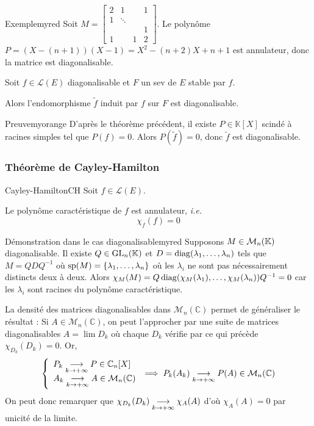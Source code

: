     \begin{omed}{Exemple}{myred}
        Soit $M = \begin{bmatrix}
            2 & 1 & & 1 \\
            1 & \ddots & & \\
            & & & 1 \\
            1 & & 1 & 2
        \end{bmatrix}$. Le polynôme $P = (X - (n+1))(X-1) = X^2 - (n+2) X + n+1$ est annulateur, donc la matrice est diagonalisable.
    \end{omed}

    \begin{coro}{}{}
        Soit $f \in \mathcal{L}(E)$ diagonalisable et $F$ un sev de $E$ stable par $f$.

        Alors l’endomorphisme $\tilde{f}$ induit par $f$ sur $F$ est diagonalisable.
    \end{coro}

    \begin{demo}{Preuve}{myorange}
        D’après le théorème précédent, il existe $P \in \mathbb{K}[X]$ scindé à racines simples tel que $P(f) = 0$. Alors $P(\tilde{f}) = 0$, donc $\tilde{f}$ est diagonalisable.
    \end{demo}

    \subsubsection{Théorème de Cayley-Hamilton}

    \begin{theo}{Cayley-Hamilton}{CH}
        Soit $f \in \mathcal{L}(E)$.

        Le polynôme caractéristique de $f$ est annulateur, \textit{i.e.} 
        \[ \chi_f(f) = 0 \]
    \end{theo}

    \begin{demo}{Démonstration dans le cas diagonalisable}{myred}
        Supposons $M \in \mk{n}$ diagonalisable. Il existe $Q \in \GL_n(\mathbb{K})$ et $D = \diag(\lambda_1,\ldots,\lambda_n)$ tels que $M = Q D Q^{-1}$ où $\sp(M) = \left\{\lambda_1,\ldots,\lambda_n\right\}$ où les $\lambda_i$ ne sont pas nécessairement distincts deux à deux. Alors $\chi_M(M) = Q \diag(\chi_M(\lambda_1), \ldots, \chi_M(\lambda_n)) Q^{-1} = 0$ car les $\lambda_i$ sont racines du polynôme caractéristique.

        La densité des matrices diagonalisables dans $\mathcal{M}_n(\mathbb{C})$ permet de généraliser le résultat : Si $A \in \mathcal{M}_n(\mathbb{C})$, on peut l’approcher par une suite de matrices diagonalisables $A = \lim D_k$ où chaque $D_k$ vérifie par ce qui précède $\chi_{D_k}(D_k) = 0$. Or, 
        \[ \et{P_k \limi{k}{+\infty} P \in \mathbb{C}_n[X]}{A_k \limi{k}{+\infty} A \in \mathcal{M}_n(\mathbb{C})} \implies P_k(A_k) \limi{k}{+\infty} P(A) \in \mathcal{M}_n(\mathbb{C}) \]    
        On peut donc remarquer que $\chi_{D_k}(D_k) \limi{k}{+\infty} \chi_A(A)$ d’où $\chi_A(A) = 0$ par unicité de la limite.
    \end{demo}

